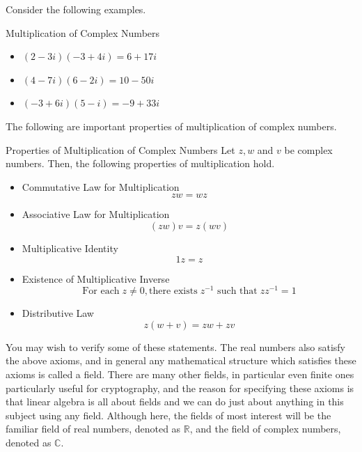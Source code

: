 Consider the following examples.

\begin{example}{Multiplication of Complex Numbers}\label{exa:complexmultiplication}
\begin{itemize}
\item $(2-3i)(-3+4i) = 6+17i$
\item $(4-7i)(6-2i) = 10-50i$
\item $(-3+6i)(5-i) = -9+33i$
\end{itemize}
\end{example}

The following are important properties of multiplication of complex numbers.

\begin{theorem}{Properties of Multiplication of Complex Numbers}\label{thm:propertiesmultiplicationcomplexnumbers}
Let $z,w$ and $v$ be complex numbers. Then, the following properties of multiplication hold.

\begin{itemize}

\item Commutative Law for Multiplication
\begin{equation*}
zw=wz
\end{equation*}

\item Associative Law for Multiplication
\begin{equation*}
\left( zw\right) v=z\left( wv\right) 
\end{equation*}

\item Multiplicative Identity
\begin{equation*}
1z=z
\end{equation*}

\item Existence of Multiplicative Inverse
\begin{equation*}
\mbox{For each}\; z\neq 0, \mbox{there exists}\; z^{-1} \mbox{ such that}\; zz^{-1}=1
\end{equation*}

\item Distributive Law
\begin{equation*}
z\left( w+v\right) =zw+zv
\end{equation*}
\end{itemize}
\end{theorem}

You may wish to verify some of these statements.  The real numbers
also satisfy the above axioms, and in general any mathematical
structure which satisfies these axioms is called a field. There are
many other fields, in particular even finite ones particularly useful
for cryptography, and the reason for specifying these axioms is that
linear algebra is all about fields and we can do just about anything
in this subject using any field. Although here, the fields of most
interest will be the familiar field of real numbers, denoted as
$\mathbb{R}$, and the field of complex numbers, denoted as
$\mathbb{C}$.

